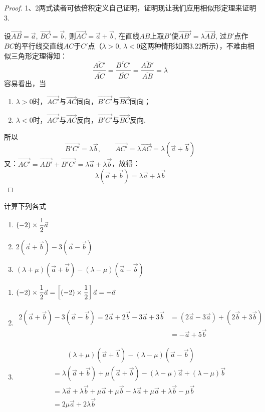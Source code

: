 \begin{proof}
1、2两式读者可依倍积定义自己证明，证明现让我们应用相似形定理来证明3.

设$\Vec{AB}=\vec{a}$, $\Vec{BC}=\vec{b}$, 则$\Vec{AC}=\vec{a}+\vec{b}$, 在直线$AB$上取$B'$使$\Vec{AB'}=\lambda\Vec{AB}$, 过$B'$点作$BC$的平行线交直线$AC$于$C'$点（$\lambda>0$, $\lambda<0$这两种情形如图3.22所示），不难由相似三角形定理得知：
\[\frac{\overline{AC'}}{\overline{AC}}=\frac{\overline{B'C'}}{\overline{BC}}=\frac{\overline{AB'}}{\overline{AB}}=\lambda\]
容易看出，当
\begin{enumerate}
    \item $\lambda>0$时，$\Vec{AC'}$与$\Vec{AC}$同向，$\Vec{B'C'}$与$\Vec{BC}$同向；
    \item $\lambda<0$时，$\Vec{AC'}$与$\Vec{AC}$反向，$\Vec{B'C'}$与$\Vec{BC}$反向. 
\end{enumerate}
所以
\[\Vec{B'C'}=\lambda\vec{b},\qquad \Vec{AC'}=\lambda\Vec{AC}=\lambda\left(\vec{a}+\vec{b}\right)\]
又：$\Vec{AC'}=\Vec{AB'}+\Vec{B'C'}=\lambda \vec{a}+\lambda\vec{b}$，故得：
\[\lambda\left(\vec{a}+\vec{b}\right)=\lambda \vec{a}+\lambda\vec{b}\]
\end{proof}

\begin{example}
计算下列各式
\begin{enumerate}
    \item $(-2)\times\dfrac{1}{2}\vec{a}$
    \item $2\left(\vec{a}+\vec{b}\right)-3\left(\vec{a}-\vec{b}\right)$
    \item $(\lambda+\mu)\left(\vec{a}+\vec{b}\right)-(\lambda-\mu)\left(\vec{a}-\vec{b}\right)$
\end{enumerate}
\end{example}

\begin{solution}
\begin{enumerate}
    \item $(-2)\times\dfrac{1}{2}\vec{a}=\left[(-2)\times\dfrac{1}{2}\right]\vec{a}=-\vec{a}$
    \item \[\begin{split}
        2\left(\vec{a}+\vec{b}\right)-3\left(\vec{a}-\vec{b}\right)=2\vec{a}+2\vec{b}-3\vec{a}+3\vec{b}&=\left(2\vec{a}-3\vec{a}\right)+\left(2\vec{b}+3\vec{b}\right)\\
        &=-\vec{a}+5\vec{b}
    \end{split}  \]
    \item \[\begin{split}
 &\qquad        (\lambda+\mu)\left(\vec{a}+\vec{b}\right)-(\lambda-\mu)\left(\vec{a}-\vec{b}\right)\\
&=\lambda \left(\vec{a}+\vec{b}\right)+\mu \left(\vec{a}+\vec{b}\right)-(\lambda-\mu)\vec{a}+(\lambda-\mu)\vec{b}\\
&=\lambda\vec{a}+\lambda \vec{b}+\mu \vec{a}+\mu \vec{b}-\lambda\vec{a}+\mu\vec{a}+\lambda\vec{b}-\mu \vec{b}\\
&=2\mu \vec{a}+2\lambda \vec{b}
\end{split}
\]
\end{enumerate}    
\end{solution}


